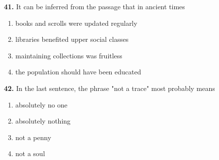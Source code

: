 \documentclass[12pt]{article}
\begin{document}
\par
\vspace{0.25\baselineskip}
\noindent\textbf{41.} It can be inferred from the passage that in ancient times
\begin{enumerate}[label=(\Alph*),leftmargin=*,itemsep=0.2em]
\item books and scrolls were updated regularly
\item libraries benefited upper social classes
\item maintaining collections was fruitless
\item the population should have been educated
\end{enumerate}
\par
\vspace{0.25\baselineskip}
\noindent\textbf{42.} In the last sentence, the phrase "not a trace" most probably means
\begin{enumerate}[label=(\Alph*),leftmargin=*,itemsep=0.2em]
\item absolutely no one
\item absolutely nothing
\item not a penny
\item not a soul
\end{enumerate}
\par
\vspace{0.25\baselineskip}
\end{document}
